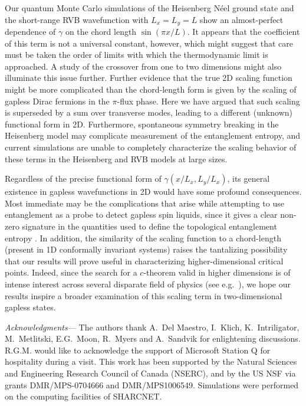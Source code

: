 \documentclass[prl,aps,twocolumn,floatfix,amsmath,amssymb,superscriptaddress,tightenlines]{revtex4}
\begin{document}
Our quantum Monte Carlo simulations of the Heisenberg N\'eel ground state and the short-range RVB wavefunction with $L_x=L_y=L$ show an almost-perfect dependence of $\gamma$ on the chord length $\sin(\pi x/L)$.
It appears that the coefficient of this term is not a universal constant, however, which might suggest that care must be taken the order of limits with which the thermodynamic limit is approached. A study of the crossover from one to two dimensions might also illuminate this issue further.  Further evidence that the true 2D scaling function might be more complicated than the chord-length form is given by the scaling of gapless Dirac fermions in the $\pi$-flux phase. Here we have argued that such scaling is superseded by a sum over transverse modes, leading to a different (unknown) functional form in 2D.  Furthermore,  spontaneous symmetry breaking in the Heisenberg model may complicate measurement of the entanglement entropy, and current simulations are unable to completely characterize the scaling behavior of these terms in the Heisenberg and RVB models at large sizes.

Regardless of the precise functional form of $\gamma(x/L_x,L_y/L_x)$, its general existence in gapless wavefunctions in 2D would have some profound consequences.  
Most immediate may be the complications that arise while attempting to use entanglement as a probe to detect gapless spin liquids, since it gives a clear non-zero signature in the quantities used to define the topological entanglement entropy \cite{KP,LW}.
In addition, the similarity of the scaling function to a chord-length (present in 1D conformally invariant systems) 
raises the tantalizing possibility that our results will prove useful in characterizing higher-dimensional critical points.
Indeed, since the search for a $c$-theorem \cite{Zamo} valid in higher dimensions is of intense interest across several disparate field of physics (see e.g.\ \cite{Cardy88,ryu,Myers,Komargodski}),
we hope our results inspire a broader examination of this scaling term in two-dimensional gapless states.

{\it Acknowledgments---} 
The authors thank A.~Del Maestro, I.~Klich, K.~Intriligator,  M.~Metlitski, E.G.~Moon, R.~Myers and A.~Sandvik for enlightening discussions. 
R.G.M. would like to acknowledge the support of Microsoft Station Q for hospitality during a visit.
This work has been supported by the Natural Sciences and Engineering
Research Council of Canada (NSERC), and by the US NSF via grants DMR/MPS-0704666 and DMR/MPS1006549.  Simulations were performed on the computing facilities of SHARCNET.



\end{document}
